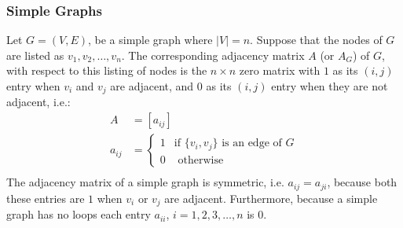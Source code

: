 \documentclass[12pt letter]{report}
\begin{document}
\subsubsection{Simple Graphs}
\noindent Let $G = \left( V, E \right) $, be a simple graph where $ \mid V \mid  = n$. Suppose that the nodes of $G$ are listed
as $v_1, v_2, \ldots, v_n$. The corresponding adjacency matrix $A$ (or $A_G$) of $G$, with respect to this listing of
nodes is the $n \times n$ zero matrix with $1$ as its $\left( i, j \right) $ entry when $v_i$ and $v_j$ are adjacent,
and $0$ as its $\left( i, j \right) $ entry when they are not adjacent, i.e.:
\begin{align*}
  A      & = \left[ a_{ij} \right]                                \\
  a_{ij} & = \begin{cases}
               1 & \text{if } \{v_i, v_j\} \text{ is an edge of } G \\
               0 & \text{ otherwise}
             \end{cases} \\
\end{align*}
The adjacency matrix of a simple graph is symmetric, i.e. $a_{ij} = a_{ji}$, because both these entries are $1$ when
$v_i$ or $v_j$ are adjacent. Furthermore, because a simple graph has no loops each entry $a_{ii}$, $i = 1, 2,3,\ldots,
  n$ is $0$.
\end{document}
